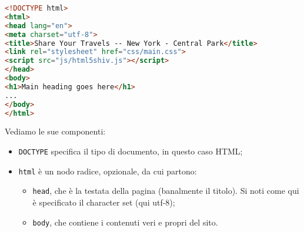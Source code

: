 \documentclass[a4paper,11pt]{article}
\begin{document}
\begin{lstlisting}[language=html, style=codestyle]	
<!DOCTYPE html>
<html>
<head lang="en">
<meta charset="utf-8">
<title>Share Your Travels -- New York - Central Park</title>
<link rel="stylesheet" href="css/main.css">
<script src="js/html5shiv.js"></script>
</head>
<body>
<h1>Main heading goes here</h1>
...
</body>
</html>
\end{lstlisting}

Vediamo le sue componenti:

\begin{itemize}
	\item \texttt{DOCTYPE} specifica il tipo di documento, in questo caso HTML;
	\item \texttt{html} è un nodo radice, opzionale, da cui partono:
		\begin{itemize}
			\item \texttt{head}, che è la testata della pagina (banalmente il titolo).
				Si noti come qui è specificato il character set (qui utf-8);
			\item \texttt{body}, che contiene i contenuti veri e propri del sito.
		\end{itemize}
\end{itemize}
\end{document}
